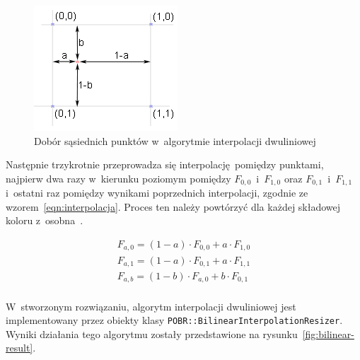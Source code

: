\begin{figure}[h]
    \centering
    \includegraphics[width=0.6\columnwidth]{figures/bi2.png}
    \caption{Dobór sąsiednich punktów w~algorytmie interpolacji dwuliniowej~\cite{algorytmy:bilinear}}
    \label{fig:bilinear-example}
\end{figure}

Następnie trzykrotnie przeprowadza się interpolację pomiędzy punktami, najpierw dwa razy w~kierunku poziomym pomiędzy $F_{0,0}$~i~$F_{1,0}$ oraz $F_{0,1}$~i~$F_{1,1}$ i~ostatni raz pomiędzy wynikami poprzednich interpolacji, zgodnie ze wzorem~\ref{eqn:interpolacja}. Proces ten należy powtórzyć dla każdej składowej koloru z~osobna~\cite{algorytmy:bilinear}.

\begin{equation}
    \label{eqn:interpolacja}
    \begin{array}{l}
        F_{a,0} = (1-a) \cdot F_{0,0} + a \cdot F_{1,0} \\
        F_{a,1} = (1-a) \cdot F_{0,1} + a \cdot F_{1,1} \\
        F_{a,b} = (1-b) \cdot F_{a,0} + b \cdot F_{0,1} \\
    \end{array} 
\end{equation}

W~stworzonym rozwiązaniu, algorytm interpolacji dwuliniowej jest implementowany przez  obiekty klasy \texttt{POBR::BilinearInterpolationResizer}. Wyniki działania tego algorytmu zostały przedstawione na rysunku~\ref{fig:bilinear-result}.

